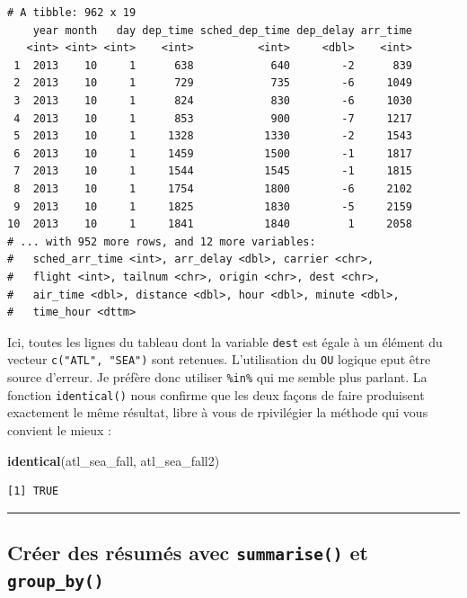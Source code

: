 \documentclass[a4paperpaper,]{article}
\newenvironment{Shaded}{\begin{snugshade}}{\end{snugshade}}
\newcommand{\KeywordTok}[1]{\textcolor[rgb]{0.12,0.11,0.11}{\textbf{#1}}}
\newcommand{\NormalTok}[1]{\textcolor[rgb]{0.12,0.11,0.11}{#1}}
\begin{document}
\begin{verbatim}
# A tibble: 962 x 19
    year month   day dep_time sched_dep_time dep_delay arr_time
   <int> <int> <int>    <int>          <int>     <dbl>    <int>
 1  2013    10     1      638            640        -2      839
 2  2013    10     1      729            735        -6     1049
 3  2013    10     1      824            830        -6     1030
 4  2013    10     1      853            900        -7     1217
 5  2013    10     1     1328           1330        -2     1543
 6  2013    10     1     1459           1500        -1     1817
 7  2013    10     1     1544           1545        -1     1815
 8  2013    10     1     1754           1800        -6     2102
 9  2013    10     1     1825           1830        -5     2159
10  2013    10     1     1841           1840         1     2058
# ... with 952 more rows, and 12 more variables:
#   sched_arr_time <int>, arr_delay <dbl>, carrier <chr>,
#   flight <int>, tailnum <chr>, origin <chr>, dest <chr>,
#   air_time <dbl>, distance <dbl>, hour <dbl>, minute <dbl>,
#   time_hour <dttm>
\end{verbatim}

Ici, toutes les lignes du tableau dont la variable \texttt{dest} est égale à un élément du vecteur \texttt{c("ATL",\ "SEA")} sont retenues. L'utilisation du \texttt{OU} logique eput être source d'erreur. Je préfère donc utiliser \texttt{\%in\%} qui me semble plus parlant. La fonction \texttt{identical()} nous confirme que les deux façons de faire produisent exactement le même résultat, libre à vous de rpivilégier la méthode qui vous convient le mieux :

\begin{Shaded}
\begin{Highlighting}[]
\KeywordTok{identical}\NormalTok{(atl_sea_fall, atl_sea_fall2)}
\end{Highlighting}
\end{Shaded}

\begin{verbatim}
[1] TRUE
\end{verbatim}

\begin{center}\rule{0.5\linewidth}{\linethickness}\end{center}

\hypertarget{creer-des-resumes-avec-summarise-et-group_by}{%
\subsection{\texorpdfstring{Créer des résumés avec \texttt{summarise()} et \texttt{group\_by()}}{Créer des résumés avec summarise() et group\_by()}}\label{creer-des-resumes-avec-summarise-et-group_by}}
\end{document}
